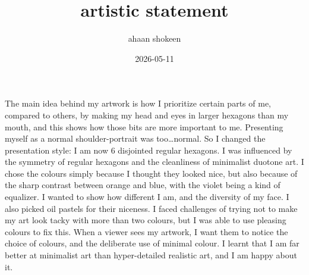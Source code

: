 \documentclass{article}
\title{artistic statement}
\author{ahaan shokeen}
\date{2026-05-11}
\begin{document}
\maketitle

The main idea behind my artwork is how I prioritize certain parts of me, compared to others, by making my head and eyes in larger hexagons than my mouth, and this shows how those bits are more important to me. Presenting myself as a normal shoulder-portrait was too\dots normal. So I changed the presentation style: I am now 6 disjointed regular hexagons. I was influenced by the symmetry of regular hexagons and the cleanliness of minimalist duotone art. I chose the colours simply because I thought they looked nice, but also because of the sharp contrast between orange and blue, with the violet being a kind of equalizer. I wanted to show how different I am, and the diversity of my face. I also picked oil pastels for their niceness. I faced challenges of trying not to make my art look tacky with more than two colours, but I was able to use pleasing colours to fix this. When a viewer sees my artwork, I want them to notice the choice of colours, and the deliberate use of minimal colour. I learnt that I am far better at minimalist art than hyper-detailed realistic art, and I am happy about it.
\end{document}
